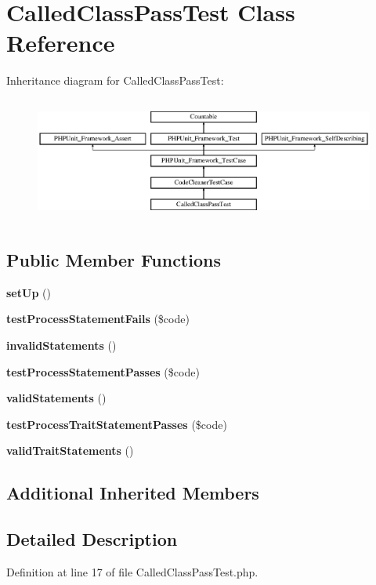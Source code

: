 \section{Called\+Class\+Pass\+Test Class Reference}
\label{class_psy_1_1_test_1_1_code_cleaner_1_1_called_class_pass_test}
Inheritance diagram for Called\+Class\+Pass\+Test\+:\begin{figure}[H]
\begin{center}
\leavevmode
\includegraphics[height=4.129793cm]{class_psy_1_1_test_1_1_code_cleaner_1_1_called_class_pass_test}
\end{center}
\end{figure}
\subsection*{Public Member Functions}
\begin{DoxyCompactItemize}
\item 
{\bf set\+Up} ()
\item 
{\bf test\+Process\+Statement\+Fails} (\$code)
\item 
{\bf invalid\+Statements} ()
\item 
{\bf test\+Process\+Statement\+Passes} (\$code)
\item 
{\bf valid\+Statements} ()
\item 
{\bf test\+Process\+Trait\+Statement\+Passes} (\$code)
\item 
{\bf valid\+Trait\+Statements} ()
\end{DoxyCompactItemize}
\subsection*{Additional Inherited Members}


\subsection{Detailed Description}


Definition at line 17 of file Called\+Class\+Pass\+Test.\+php.



